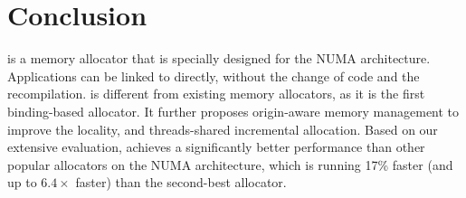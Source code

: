 \section{Conclusion}
\label{sec:conclusion}

\NM{} is a memory allocator that is specially designed for the NUMA architecture. Applications can be linked to \NM{} directly, without the change of code and the recompilation. \NM{} is different from existing memory allocators, as it is the first binding-based allocator. It further proposes origin-aware memory management to improve the locality, and threads-shared incremental allocation. 
Based on our extensive evaluation, \NM{} achieves a significantly better performance than other popular allocators on the NUMA architecture, which is running 17\% faster (and up to $6.4\times$ faster) than the second-best allocator.
